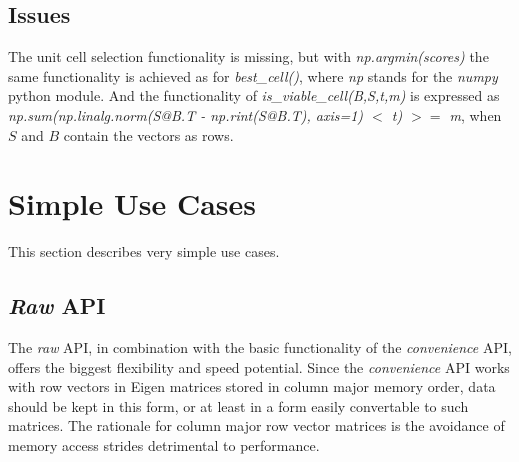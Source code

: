 \documentclass[a4paper,10pt]{article}
\begin{document}
\subsection{Issues}

The unit cell selection functionality is missing, but with \emph{np.argmin(scores)} the same functionality is achieved as for \emph{best\_cell()}, where \emph{np} stands for the \emph{numpy} python module. And the functionality of \emph{is\_viable\_cell(B,S,t,m)} is expressed as \emph{np.sum(np.linalg.norm(S@B.T - np.rint(S@B.T), axis=1) $<$ t) $>=$ m}, when $S$ and $B$ contain the vectors as rows.

\section{Simple Use Cases}

This section describes very simple use cases.

\subsection{\emph{Raw} API}
\lstset{language=C++}

The \emph{raw} API, in combination with the basic functionality of the \emph{convenience} API, offers the biggest flexibility and speed potential. Since the \emph{convenience} API works with row vectors in Eigen matrices stored in column major memory order, data should be kept in this form, or at least in a form easily convertable to such matrices. The rationale for column major row vector matrices is the avoidance of memory access strides detrimental to performance.
\end{document}
